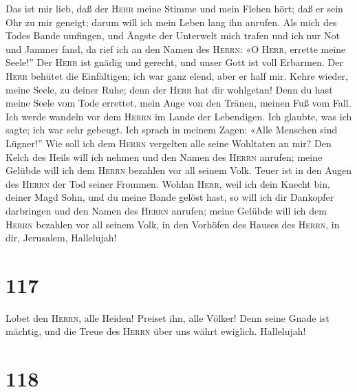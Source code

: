  Das ist mir lieb, daß der \textsc{Herr} meine Stimme und
mein Flehen hört;  daß er sein Ohr zu mir geneigt; darum
will ich mein Leben lang ihn anrufen.  Als mich des Todes
Bande umfingen, und Ängste der Unterwelt mich trafen und ich nur Not und
Jammer fand,  da rief ich an den Namen des \textsc{Herrn}:
«O \textsc{Herr}, errette meine Seele!''  Der
\textsc{Herr} ist gnädig und gerecht, und unser Gott ist voll Erbarmen.
 Der \textsc{Herr} behütet die Einfältigen; ich war ganz
elend, aber er half mir.  Kehre wieder, meine Seele, zu
deiner Ruhe; denn der \textsc{Herr} hat dir wohlgetan! 
Denn du hast meine Seele vom Tode errettet, mein Auge von den Tränen,
meinen Fuß vom Fall.  Ich werde wandeln vor dem
\textsc{Herrn} im Lande der Lebendigen.  Ich glaubte, was
ich sagte; ich war sehr gebeugt.  Ich sprach in meinem
Zagen: «Alle Menschen sind Lügner!''  Wie soll ich dem
\textsc{Herrn} vergelten alle seine Wohltaten an mir? 
Den Kelch des Heils will ich nehmen und den Namen des \textsc{Herrn}
anrufen;  meine Gelübde will ich dem \textsc{Herrn}
bezahlen vor all seinem Volk.  Teuer ist in den Augen des
\textsc{Herrn} der Tod seiner Frommen.  Wohlan
\textsc{Herr}, weil ich dein Knecht bin, deiner Magd Sohn, und du meine
Bande gelöst hast,  so will ich dir Dankopfer darbringen
und den Namen des \textsc{Herrn} anrufen;  meine Gelübde
will ich dem \textsc{Herrn} bezahlen vor all seinem Volk,
 in den Vorhöfen des Hauses des \textsc{Herrn}, in dir,
Jerusalem, Hallelujah!

\hypertarget{section-116}{%
\section{117}\label{section-116}}

 Lobet den \textsc{Herrn}, alle Heiden! Preiset ihn, alle
Völker!  Denn seine Gnade ist mächtig, und die Treue des
\textsc{Herrn} über uns währt ewiglich. Hallelujah!

\hypertarget{section-117}{%
\section{118}\label{section-117}}

